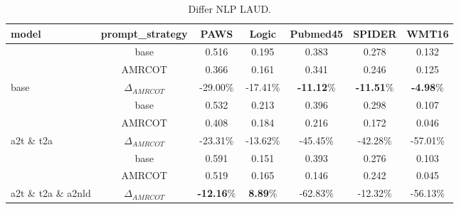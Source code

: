 \setlength{\tabcolsep}{5pt}
\renewcommand{\arraystretch}{1.2}
\begin{table*}[]
\centering
\vspace{-0.1in}
\caption{Differ NLP LAUD.}
\label{tab:differ_nlp_laud}
\vspace{0.05in}
\small
\begin{tabular}{l|c|ccccc}
\toprule
\textbf{model}                    & \textbf{prompt\_strategy} & \textbf{PAWS}                   & \textbf{Logic}                  & \textbf{Pubmed45}               & \textbf{SPIDER}                 & \textbf{WMT16}                  \\
\midrule
                                  & base                      & 0.516                           & 0.195                           & 0.383                           & 0.278                           & 0.132                           \\
                                  & AMRCOT                    & 0.366                           & 0.161                           & 0.341                           & 0.246                           & 0.125                           \\
\multirow{-3}{*}{base}            & ${\Delta}_{AMRCOT}$                   & {\color[HTML]{FF0000} -29.00\%} & {\color[HTML]{FF0000} -17.41\%} & {\color[HTML]{FF0000} \textbf{-11.12}\%} & {\color[HTML]{FF0000} \textbf{-11.51}\%} & {\color[HTML]{FF0000} \textbf{-4.98}\%}  \\
\hline
                                  & base                      & 0.532                           & 0.213                           & 0.396                           & 0.298                           & 0.107                           \\
                                  & AMRCOT                    & 0.408                           & 0.184                           & 0.216                           & 0.172                           & 0.046                           \\
\multirow{-3}{*}{a2t \& t2a}        & ${\Delta}_{AMRCOT}$                   & {\color[HTML]{FF0000} -23.31\%} & {\color[HTML]{FF0000} -13.62\%} & {\color[HTML]{FF0000} -45.45\%} & {\color[HTML]{FF0000} -42.28\%} & {\color[HTML]{FF0000} -57.01\%} \\
\hline
                                  & base                      & 0.591                           & 0.151                           & 0.393                           & 0.276                           & 0.103                           \\
                                  & AMRCOT                    & 0.519                           & 0.165                           & 0.146                           & 0.242                           & 0.045                           \\
\multirow{-3}{*}{a2t \& t2a \& a2nld} & ${\Delta}_{AMRCOT}$                   & {\color[HTML]{FF0000} \textbf{-12.16}\%} & {\color[HTML]{00B050} \textbf{8.89}\%}   & {\color[HTML]{FF0000} -62.83\%} & {\color[HTML]{FF0000} -12.32\%} & {\color[HTML]{FF0000} -56.13\%} \\
\bottomrule
\end{tabular}
\end{table*}
